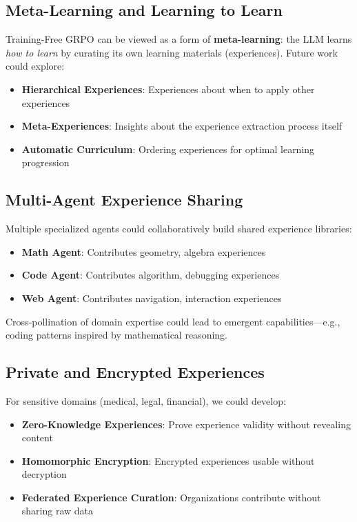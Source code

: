 \documentclass[11pt,a4paper]{article}
\begin{document}
\subsection{Meta-Learning and Learning to Learn}

Training-Free GRPO can be viewed as a form of \textbf{meta-learning}: the LLM learns \textit{how to learn} by curating its own learning materials (experiences). Future work could explore:

\begin{itemize}
    \item \textbf{Hierarchical Experiences}: Experiences about when to apply other experiences
    \item \textbf{Meta-Experiences}: Insights about the experience extraction process itself
    \item \textbf{Automatic Curriculum}: Ordering experiences for optimal learning progression
\end{itemize}

\subsection{Multi-Agent Experience Sharing}

Multiple specialized agents could collaboratively build shared experience libraries:

\begin{itemize}
    \item \textbf{Math Agent}: Contributes geometry, algebra experiences
    \item \textbf{Code Agent}: Contributes algorithm, debugging experiences
    \item \textbf{Web Agent}: Contributes navigation, interaction experiences
\end{itemize}

Cross-pollination of domain expertise could lead to emergent capabilities—e.g., coding patterns inspired by mathematical reasoning.

\subsection{Private and Encrypted Experiences}

For sensitive domains (medical, legal, financial), we could develop:

\begin{itemize}
    \item \textbf{Zero-Knowledge Experiences}: Prove experience validity without revealing content
    \item \textbf{Homomorphic Encryption}: Encrypted experiences usable without decryption
    \item \textbf{Federated Experience Curation}: Organizations contribute without sharing raw data
\end{itemize}
\end{document}
